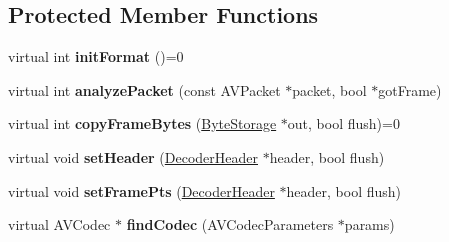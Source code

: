 \subsection*{Protected Member Functions}
\begin{DoxyCompactItemize}
\item 
\mbox{\label{classffmpeg_1_1Stream_ab1480f3cc5bd0f73f2a767a91a539ea3}} 
virtual int {\bfseries init\+Format} ()=0
\item 
\mbox{\label{classffmpeg_1_1Stream_a4574b3af1a1a4a99048c2e148ca013ef}} 
virtual int {\bfseries analyze\+Packet} (const A\+V\+Packet $\ast$packet, bool $\ast$got\+Frame)
\item 
\mbox{\label{classffmpeg_1_1Stream_a9828a5dfa3a934a0b4c583031a8c7d5d}} 
virtual int {\bfseries copy\+Frame\+Bytes} (\hyperlink{classffmpeg_1_1ByteStorage}{Byte\+Storage} $\ast$out, bool flush)=0
\item 
\mbox{\label{classffmpeg_1_1Stream_a4868d8724d5cb6806ed5135433f2e0d3}} 
virtual void {\bfseries set\+Header} (\hyperlink{structffmpeg_1_1DecoderHeader}{Decoder\+Header} $\ast$header, bool flush)
\item 
\mbox{\label{classffmpeg_1_1Stream_a5934c2f7b3c3e17973a0b26121953bb5}} 
virtual void {\bfseries set\+Frame\+Pts} (\hyperlink{structffmpeg_1_1DecoderHeader}{Decoder\+Header} $\ast$header, bool flush)
\item 
\mbox{\label{classffmpeg_1_1Stream_a0eb97aee0aeb0c056ecfa9a891a999f8}} 
virtual A\+V\+Codec $\ast$ {\bfseries find\+Codec} (A\+V\+Codec\+Parameters $\ast$params)
\end{DoxyCompactItemize}
